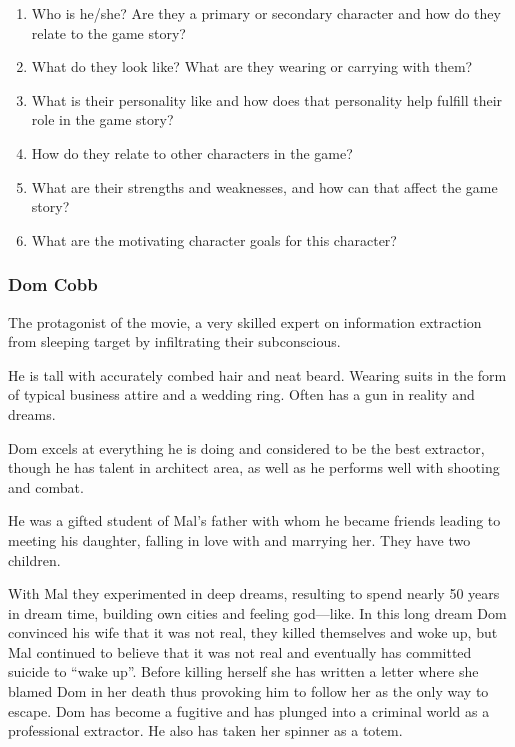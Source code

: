 \documentclass{article}
\begin{document}
\begin{enumerate}

  \item Who is he/she? Are they a primary or secondary character and how do they
    relate to the game story?

  \item What do they look like? What are they wearing or carrying with them?

  \item What is their personality like and how does that personality help
    fulfill their role in the game story?

  \item How do they relate to other characters in the game?

  \item What are their strengths and weaknesses, and how can that affect the game story?

  \item What are the motivating character goals for this character?

\end{enumerate}

\subsubsection*{Dom Cobb}

The protagonist of the movie, a very skilled expert on information extraction
from sleeping target by infiltrating their subconscious.

He is tall with accurately combed hair and neat beard. Wearing suits in the form
of typical business attire and a wedding ring. Often has a gun in reality and
dreams.

Dom excels at everything he is doing and considered to be the best extractor,
though he has talent in architect area, as well as he performs well with
shooting and combat.

He was a gifted student of Mal's father with whom he became friends leading to
meeting his daughter, falling in love with and marrying her. They have two
children.

With Mal they experimented in deep dreams, resulting to spend nearly 50 years in
dream time, building own cities and feeling god---like. In this long dream Dom
convinced his wife that it was not real, they killed themselves and woke up, but
Mal continued to believe that it was not real and eventually has committed
suicide to ``wake up''. Before killing herself she has written a letter where
she blamed Dom in her death thus provoking him to follow her as the only way to
escape. Dom has become a fugitive and has plunged into a criminal world as a
professional extractor. He also has taken her spinner as a totem.
\end{document}
